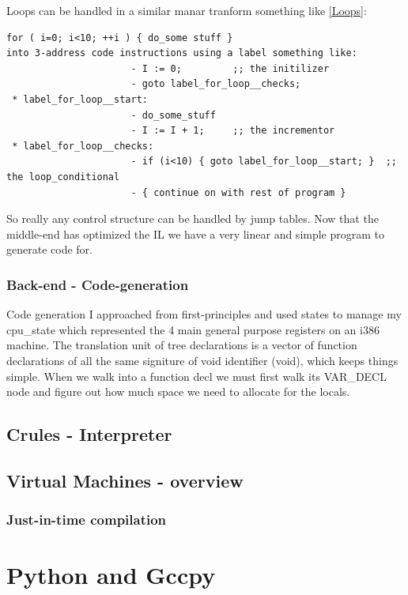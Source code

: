 \documentclass[defaultstyle,11pt]{article}
\begin{document}
Loops can be handled in a similar manar tranform something like \ref{Loops}:

\begin{lstlisting}
for ( i=0; i<10; ++i ) { do_some stuff }
into 3-address code instructions using a label something like:
                      - I := 0;         ;; the initilizer
                      - goto label_for_loop__checks;
 * label_for_loop__start:
                      - do_some_stuff
                      - I := I + 1;     ;; the incrementor
 * label_for_loop__checks:
                      - if (i<10) { goto label_for_loop__start; }  ;; the loop_conditional
                      - { continue on with rest of program }
\end{lstlisting}

So really any control structure can be handled by jump tables. Now that the middle-end has
optimized the IL we have a very linear and simple program to generate code for.

\subsubsection{Back-end - Code-generation}

Code generation I approached from first-principles and used states to manage
my cpu\_state which represented the 4 main general purpose registers on an i386 machine.
The translation unit of tree declarations is a vector of function declarations of all the
same signiture of void identifier (void), which keeps things simple. When we walk into a
function decl we must first walk its VAR\_DECL node and figure out how much space we need to
allocate for the locals.

\subsection{Crules - Interpreter}

\subsection{Virtual Machines - overview}

\subsubsection{Just-in-time compilation}

\section{Python and Gccpy}
\end{document}
